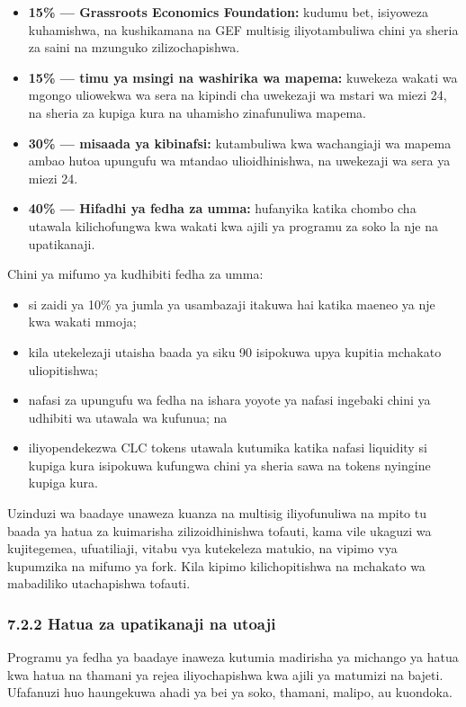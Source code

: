 \documentclass[11pt]{article}
\begin{document}
\begin{itemize}[leftmargin=*]
\item \textbf{15\% --- Grassroots Economics Foundation:} kudumu bet, isiyoweza kuhamishwa, na kushikamana na GEF multisig iliyotambuliwa chini ya sheria za saini na mzunguko zilizochapishwa.
\item \textbf{15\% --- timu ya msingi na washirika wa mapema:} kuwekeza wakati wa mgongo uliowekwa wa sera na kipindi cha uwekezaji wa mstari wa miezi 24, na sheria za kupiga kura na uhamisho zinafunuliwa mapema.
\item \textbf{30\% --- misaada ya kibinafsi:} kutambuliwa kwa wachangiaji wa mapema ambao hutoa upungufu wa mtandao ulioidhinishwa, na uwekezaji wa sera ya miezi 24.
\item \textbf{40\% --- Hifadhi ya fedha za umma:} hufanyika katika chombo cha utawala kilichofungwa kwa wakati kwa ajili ya programu za soko la nje na upatikanaji.
\end{itemize}
Chini ya mifumo ya kudhibiti fedha za umma:

\begin{itemize}[leftmargin=*]
\item si zaidi ya 10\% ya jumla ya usambazaji itakuwa hai katika maeneo ya nje kwa wakati mmoja;
\item kila utekelezaji utaisha baada ya siku 90 isipokuwa upya kupitia mchakato uliopitishwa;
\item nafasi za upungufu wa fedha na ishara yoyote ya nafasi ingebaki chini ya udhibiti wa utawala wa kufunua; na
\item iliyopendekezwa CLC tokens utawala kutumika katika nafasi liquidity si kupiga kura isipokuwa kufungwa chini ya sheria sawa na tokens nyingine kupiga kura.
\end{itemize}
Uzinduzi wa baadaye unaweza kuanza na multisig iliyofunuliwa na mpito tu baada ya hatua za kuimarisha zilizoidhinishwa tofauti, kama vile ukaguzi wa kujitegemea, ufuatiliaji, vitabu vya kutekeleza matukio, na vipimo vya kupumzika na mifumo ya fork. Kila kipimo kilichopitishwa na mchakato wa mabadiliko utachapishwa tofauti.

\subsubsection*{7.2.2 Hatua za upatikanaji na utoaji}

Programu ya fedha ya baadaye inaweza kutumia madirisha ya michango ya hatua kwa hatua na thamani ya rejea iliyochapishwa kwa ajili ya matumizi na bajeti. Ufafanuzi huo haungekuwa ahadi ya bei ya soko, thamani, malipo, au kuondoka.
\end{document}
